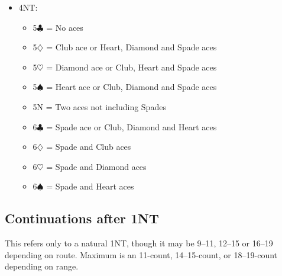 \documentclass[a4paper,14pt]{extarticle}
\begin{document}
\begin{itemize}
\item 4NT:
	\begin{itemize}
	\item 5$\clubsuit$ = No aces
	\item 5$\diamondsuit$ = Club ace or Heart, Diamond and Spade aces
	\item 5$\heartsuit$ = Diamond ace or Club, Heart and Spade aces
	\item 5$\spadesuit$ = Heart ace or Club, Diamond and Spade aces
	\item 5N = Two aces not including Spades
	\item 6$\clubsuit$ = Spade ace or Club, Diamond and Heart aces
	\item 6$\diamondsuit$ = Spade and Club aces
	\item 6$\heartsuit$ = Spade and Diamond aces
	\item 6$\spadesuit$ = Spade and Heart aces
	\end{itemize}

\end{itemize}

\newpage

\subsection{Continuations after 1NT}
\label{sec:resp:1n}


This refers only to a natural 1NT, though it may be 9--11, 12--15 or 16--19
depending on route. Maximum is an 11-count, 14--15-count, or 18--19-count
depending on range.
\end{document}
